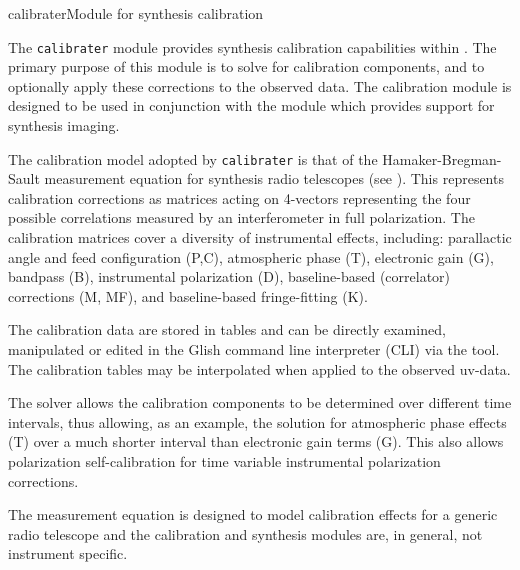 \begin{ahmodule}{calibrater}{Module for synthesis calibration}

\begin{ahdescription}

The {\tt calibrater} module provides synthesis calibration
capabilities within \aipspp. The primary purpose of this module is to
solve for calibration components, and to optionally apply these
corrections to the observed data. The calibration module is designed
to be used in conjunction with the  module
which provides support for synthesis imaging.

The calibration model adopted by {\tt calibrater} is that of the
Hamaker-Bregman-Sault measurement equation for synthesis radio
telescopes (see ). This represents calibration corrections as
matrices acting on 4-vectors representing the four possible
correlations measured by an interferometer in full polarization. The
calibration matrices cover a diversity of instrumental effects,
including: parallactic angle and feed configuration (P,C), atmospheric
phase (T), electronic gain (G), bandpass (B), instrumental
polarization (D), baseline-based (correlator) corrections (M, MF), 
and baseline-based fringe-fitting (K).

The calibration data are stored in \aipspp tables and can be directly
examined, manipulated or edited in the Glish command line interpreter
(CLI) via the  tool. The calibration tables may be
interpolated when applied to the observed uv-data.

The solver allows the calibration components to be determined over
different time intervals, thus allowing, as an example, the solution
for atmospheric phase effects (T) over a much shorter interval than
electronic gain terms (G). This also allows polarization
self-calibration for time variable instrumental polarization
corrections.

The measurement equation is designed to model calibration effects for
a generic radio telescope and the calibration and synthesis modules
are, in general, not instrument specific.


\end{ahdescription}
\end{ahmodule}
